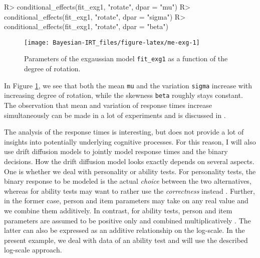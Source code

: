 \documentclass[
]{jss}
\begin{document}
\begin{CodeChunk}

\begin{CodeInput}
R> conditional_effects(fit_exg1, "rotate", dpar = "mu")
R> conditional_effects(fit_exg1, "rotate", dpar = "sigma")
R> conditional_effects(fit_exg1, "rotate", dpar = "beta")
\end{CodeInput}
\end{CodeChunk}

\begin{CodeChunk}
\begin{figure}

{\centering \texttt{[image: Bayesian-IRT\_files/figure-latex/me-exg-1]} 

}

\caption[Parameters of the exgaussian model \texttt{fit\_exg1} as a function of the degree of rotation]{Parameters of the exgaussian model \texttt{fit\_exg1} as a function of the degree of rotation.}\label{fig:me-exg}
\end{figure}
\end{CodeChunk}

In Figure \ref{fig:me-exg}, we see that both the mean \texttt{mu} and
the variation \texttt{sigma} increase with increasing degree of
rotation, while the skewness \texttt{beta} roughly stays constant. The
observation that mean and variation of response times increase
simultaneously can be made in a lot of experiments and is discussed in
\citet{wagenmakers2007}.

The analysis of the response times is interesting, but does not provide
a lot of insights into potentially underlying cognitive processes. For
this reason, I will also use drift diffusion models to jointly model
response times and the binary decisions. How the drift diffusion model
looks exactly depends on several aspects. One is whether we deal with
personality or ability tests. For personality tests, the binary response
to be modeled is the actual \emph{choice} between the two alternatives,
whereas for ability tests may want to rather use the \emph{correctness}
instead \citep{tuerlinckx2005, vandermaas2011}. Further, in the former
case, person and item parameters may take on any real value and we
combine them additively. In contrast, for ability tests, person and item
parameters are assumed to be positive only and combined multiplicatively
\citep{vandermaas2011}. The latter can also be expressed as an additive
relationship on the log-scale. In the present example, we deal with data
of an ability test and will use the described log-scale approach.
\end{document}
